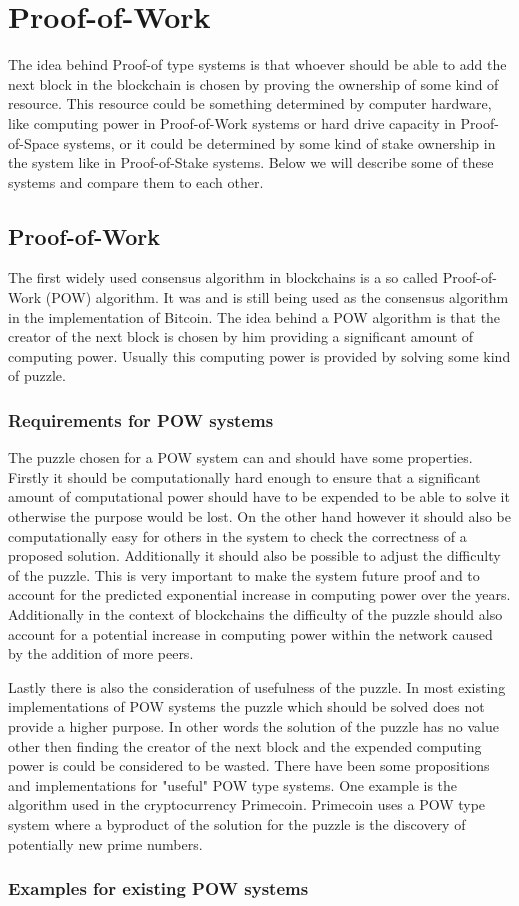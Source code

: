 \section{Proof-of-Work}

The idea behind Proof-of type systems is that whoever should be able to add the next block in the blockchain is chosen by proving the ownership of some kind of resource. This resource could be
something determined by computer hardware, like computing power in Proof-of-Work systems or hard drive capacity in Proof-of-Space systems, or it could be determined by some kind of stake ownership
in the system like in Proof-of-Stake systems. Below we will describe some of these systems and compare them to each other.

\subsection{Proof-of-Work}

The first widely used consensus algorithm in blockchains is a so called Proof-of-Work (POW) algorithm. It was and is still being used as the consensus algorithm in the implementation of Bitcoin.\cite{url:bitcoin}
The idea behind a POW algorithm is that the creator of the next block is chosen by him providing a significant amount of computing power. Usually this computing power is provided by solving some
kind of puzzle. 

\subsubsection{Requirements for POW systems}

The puzzle chosen for a POW system can and should have some properties. Firstly it should be computationally hard enough to ensure that a significant amount of computational power should have 
to be expended to be able to solve it otherwise the purpose would be lost. On the other hand however it should also be computationally easy for others in the system to check the correctness 
of a proposed solution. Additionally it should also be possible to adjust the difficulty of the puzzle. This is very important to make the system future proof and to account for the predicted
exponential increase in computing power over the years.\cite{url:moore_law} Additionally in the context of blockchains the difficulty of the puzzle should also account for a potential
increase in computing power within the network caused by the addition of more peers.\par
Lastly there is also the consideration of usefulness of the puzzle. In most existing implementations
of POW systems the puzzle which should be solved does not provide a higher purpose. In other words the solution of the puzzle has no value other then finding the creator of the next block
and the expended computing power is could be considered to be wasted.\cite{url:pow_useless} There have been some propositions and implementations for "useful" POW type systems. One example is
the algorithm used in the cryptocurrency Primecoin. Primecoin uses a POW type system where a byproduct of the solution for the puzzle is the discovery of potentially new prime numbers.\cite{url:primecoin}

\subsubsection{Examples for existing POW systems}


